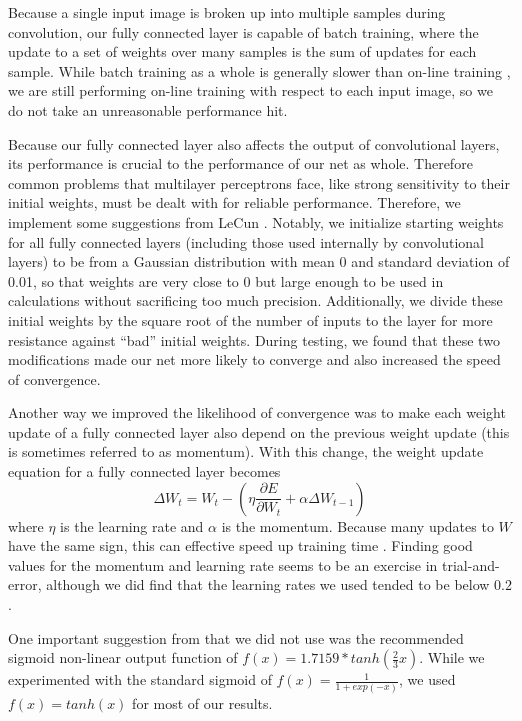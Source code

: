 \documentclass[10pt,twocolumn,letterpaper]{article}
\begin{document}
Because a single input image is broken up into multiple samples during convolution, our
fully connected layer is capable of batch training, where the update to a set of weights over
many samples is the sum of updates for each sample. While batch training as a whole is generally
slower than on-line training \cite{EfficientBackProp}, we are still performing on-line training
with respect to each input image, so we do not take an unreasonable performance hit.

Because our fully connected layer also affects the output of convolutional layers, its performance
is crucial to the performance of our net as whole. Therefore common problems that multilayer
perceptrons face, like strong sensitivity to their initial weights, must be dealt with for
reliable performance. Therefore, we implement some suggestions from LeCun
\etal \cite{EfficientBackProp}.
Notably, we initialize starting weights for all fully connected layers (including those used
internally by convolutional layers) to be from a Gaussian distribution with mean 0 and standard
deviation of 0.01, so that weights are very close to 0 but large enough to be used in calculations
without sacrificing too much precision.
Additionally, we divide these initial weights by the square root of the number of inputs to the
layer for more resistance against ``bad'' initial weights.
During testing, we found that these two modifications made our net more likely to converge and
also increased the speed of convergence.

Another way we improved the likelihood of convergence was to make each weight update of a
fully connected layer also depend on the previous weight update (this is sometimes
referred to as momentum). With this change, the weight update equation for a fully connected
layer becomes
$$\Delta W_{t} = W_{t} - (\eta \frac{\partial E}{\partial W_{t}} +
\alpha \Delta W_{t-1})$$
where $\eta$ is the learning rate and $\alpha$ is the momentum.
Because many updates to $W$ have the same sign, this can effective speed up training time
\cite{WinMomentum}.
Finding good values for the momentum and learning rate seems to be
an exercise in trial-and-error, although we did find that
the learning rates we used tended to be below $0.2$.

One important suggestion from \cite{EfficientBackProp} that we did not use was the
recommended sigmoid non-linear output function of $f(x) = 1.7159 * tanh(\frac{2}{3}x)$.
While we experimented with the standard sigmoid of $f(x) = \frac{1}{1 + exp(-x)}$,
we used $f(x) = tanh(x)$ for most of our results.
\end{document}
